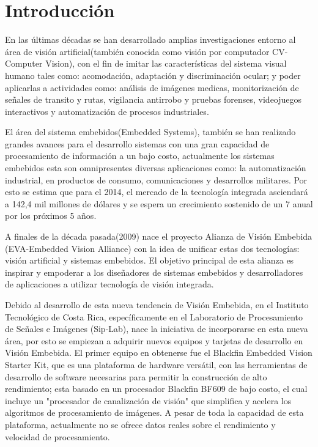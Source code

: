 
\chapter{Introducción}
\label{chp:intro}
En las últimas décadas se han desarrollado amplias investigaciones entorno al área de visión artificial(también conocida como visión por computador CV-Computer Vision)\cite{Shilov1973}, con el fin de imitar las características del sistema visual humano tales como: acomodación, adaptación y discriminación ocular; y poder aplicarlas a actividades como: análisis de imágenes medicas, monitorización de señales de transito y rutas, vigilancia antirrobo y pruebas forenses, videojuegos interactivos y automatización de procesos industriales. 

El área del sistema embebidos(Embedded Systems), también se han realizado grandes avances para el desarrollo sistemas con una gran capacidad de procesamiento de información a un bajo costo, actualmente los sistemas embebidos esta son omnipresentes diversas aplicaciones como: la automatización industrial, en productos de consumo, comunicaciones y desarrollos militares. Por esto se estima que para el 2014, el mercado de la tecnología integrada asciendará a 142,4 mil millones de dólares y se espera un crecimiento sostenido de un 7 anual por los próximos 5 años\cite{market2014}.



A finales de la década pasada(2009) nace el proyecto Alianza de Visión Embebida (EVA-Embedded Vision Alliance) con la idea de unificar estas dos tecnologías: visión artificial y sistemas embebidos. El objetivo principal de esta alianza es inspirar y empoderar a los diseñadores de sistemas embebidos y desarrolladores de aplicaciones a utilizar tecnología de visión integrada\cite{alliance2014}. 

Debido al desarrollo de esta nueva tendencia de Visión Embebida, en el Instituto Tecnológico de Costa Rica, específicamente en el Laboratorio de Procesamiento de Señales e Imágenes (Sip-Lab), nace la iniciativa de incorporarse en esta nueva área, por esto se empiezan a adquirir nuevos equipos y tarjetas de desarrollo en Visión Embebida. El primer equipo en obtenerse fue el Blackfin Embedded Vision Starter Kit, que es una plataforma de hardware versátil, con las herramientas de desarrollo de software necesarias para permitir la construcción de alto rendimiento; esta basado en un procesador Blackfin BF609 de bajo costo, el cual incluye un "procesador de canalización de visión" que simplifica y acelera los algoritmos de procesamiento de imágenes\cite{finboard}. A pesar de toda la capacidad de esta plataforma, actualmente no se ofrece datos reales sobre el rendimiento y velocidad de procesamiento.

